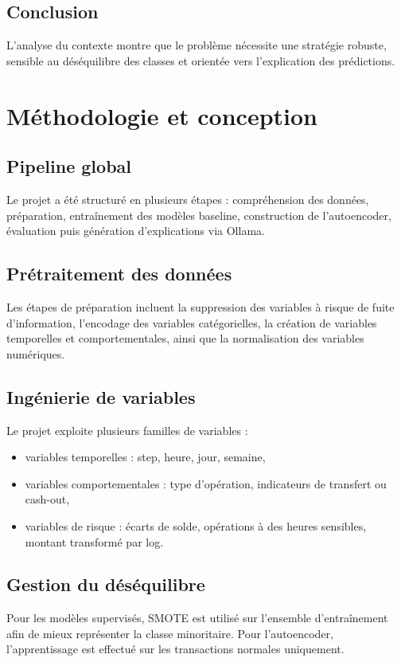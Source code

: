 \documentclass[12pt,a4paper,twoside]{report}
\begin{document}
\section{Conclusion}
L'analyse du contexte montre que le problème nécessite une stratégie robuste, sensible au déséquilibre des classes et orientée vers l'explication des prédictions.

\chapter{Méthodologie et conception}

\section{Pipeline global}
Le projet a été structuré en plusieurs étapes : compréhension des données, préparation, entraînement des modèles baseline, construction de l'autoencoder, évaluation puis génération d'explications via Ollama.

\section{Prétraitement des données}
Les étapes de préparation incluent la suppression des variables à risque de fuite d'information, l'encodage des variables catégorielles, la création de variables temporelles et comportementales, ainsi que la normalisation des variables numériques.

\section{Ingénierie de variables}
Le projet exploite plusieurs familles de variables :
\begin{itemize}
  \item variables temporelles : step, heure, jour, semaine,
  \item variables comportementales : type d'opération, indicateurs de transfert ou cash-out,
  \item variables de risque : écarts de solde, opérations à des heures sensibles, montant transformé par log.
\end{itemize}

\section{Gestion du déséquilibre}
Pour les modèles supervisés, SMOTE est utilisé sur l'ensemble d'entraînement afin de mieux représenter la classe minoritaire. Pour l'autoencoder, l'apprentissage est effectué sur les transactions normales uniquement.
\end{document}
